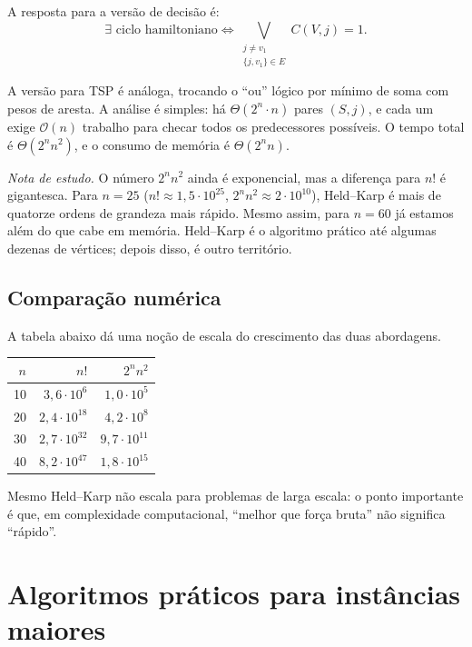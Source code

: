 \documentclass[11pt,a4paper]{article}
\theoremstyle{definition}
\newcommand{\nota}[1]{%
  \par\medskip
  {\small\color{notagray}\textit{Nota de estudo.} #1}\par\medskip
}
\begin{document}
A resposta para a versão de decisão é:
\[
  \exists \text{ ciclo hamiltoniano} \iff \bigvee_{\substack{j \neq v_1 \\ \{j, v_1\} \in E}} C(V, j) = 1.
\]

A versão para TSP é análoga, trocando o ``ou'' lógico por mínimo de soma com pesos de aresta. A análise é simples: há $\Theta(2^n \cdot n)$ pares $(S, j)$, e cada um exige $\mathcal{O}(n)$ trabalho para checar todos os predecessores possíveis. O tempo total é $\Theta(2^n n^2)$, e o consumo de memória é $\Theta(2^n n)$.

\nota{O número $2^n n^2$ ainda é exponencial, mas a diferença para $n!$ é gigantesca. Para $n = 25$ ($n! \approx 1{,}5 \cdot 10^{25}$, $2^n n^2 \approx 2 \cdot 10^{10}$), Held--Karp é mais de quatorze ordens de grandeza mais rápido. Mesmo assim, para $n = 60$ já estamos além do que cabe em memória. Held--Karp é o algoritmo prático até algumas dezenas de vértices; depois disso, é outro território.}

\subsection{Comparação numérica}

A tabela abaixo dá uma noção de escala do crescimento das duas abordagens.

\begin{center}
\begin{tabular}{rrr}
\toprule
$n$ & $n!$               & $2^n n^2$         \\
\midrule
10  & $3{,}6 \cdot 10^6$ & $1{,}0 \cdot 10^5$ \\
20  & $2{,}4 \cdot 10^{18}$ & $4{,}2 \cdot 10^8$ \\
30  & $2{,}7 \cdot 10^{32}$ & $9{,}7 \cdot 10^{11}$ \\
40  & $8{,}2 \cdot 10^{47}$ & $1{,}8 \cdot 10^{15}$ \\
\bottomrule
\end{tabular}
\end{center}

Mesmo Held--Karp não escala para problemas de larga escala: o ponto importante é que, em complexidade computacional, ``melhor que força bruta'' não significa ``rápido''.

\section{Algoritmos práticos para instâncias maiores}
\end{document}
